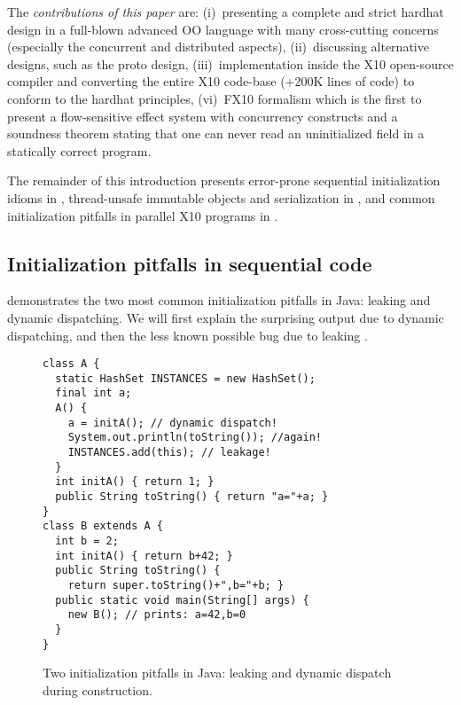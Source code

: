 The \emph{contributions of this paper} are:
    (i)~presenting a complete and strict hardhat design in a
        full-blown advanced OO language with many cross-cutting concerns
        (especially the concurrent and distributed aspects),
    (ii)~discussing alternative designs, such as the proto design,
    (iii)~implementation inside the X10 open-source compiler and
        converting the entire X10 code-base (+200K lines of code) %
        to conform to the hardhat principles,
    (vi)~FX10 formalism which is the first to present a flow-sensitive effect system with concurrency constructs
    and a soundness theorem stating that one can never read an
    uninitialized field in a statically correct  program.


The remainder of this introduction
    presents error-prone sequential initialization idioms in ,
    thread-unsafe immutable objects and serialization in , and
    common initialization pitfalls in parallel X10 programs in .

\vspace{-0.1cm} %
\subsection{Initialization pitfalls in sequential code}
\label{Section:Initialization-pitfalls}

 demonstrates the two most common initialization pitfalls in Java:
    leaking \this and dynamic dispatching.
We will first explain the surprising output due to dynamic dispatching,
    and then the less known possible bug due to leaking \this.

\begin{figure}
\vspace{-0.2cm}\begin{lstlisting}
class A {
  static HashSet INSTANCES = new HashSet();
  final int a;
  A() {
    a = initA(); // dynamic dispatch!
    System.out.println(toString()); //again!
    INSTANCES.add(this); // leakage!
  }
  int initA() { return 1; }
  public String toString() { return "a="+a; }
}
class B extends A {
  int b = 2;
  int initA() { return b+42; }
  public String toString() {
    return super.toString()+",b="+b; }
  public static void main(String[] args) {
    new B(); // prints: a=42,b=0
  }
}
\end{lstlisting}\vspace{-0.2cm}
\caption{Two initialization pitfalls in Java:
    leaking \this and dynamic dispatch during construction.}
\label{Figure:TwoPitfalls}
\end{figure}

